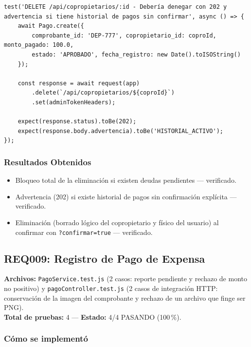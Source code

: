 \documentclass[12pt,a4paper]{article}
\begin{document}
\begin{lstlisting}[caption={Prueba de la advertencia 202 por historial activo (\texttt{copropietarioController.test.js})}]
test('DELETE /api/copropietarios/:id - Debería denegar con 202 y advertencia si tiene historial de pagos sin confirmar', async () => {
    await Pago.create({
        comprobante_id: 'DEP-777', copropietario_id: coproId, monto_pagado: 100.0,
        estado: 'APROBADO', fecha_registro: new Date().toISOString()
    });

    const response = await request(app)
        .delete(`/api/copropietarios/${coproId}`)
        .set(adminTokenHeaders);

    expect(response.status).toBe(202);
    expect(response.body.advertencia).toBe('HISTORIAL_ACTIVO');
});
\end{lstlisting}

\subsubsection*{Resultados Obtenidos}
\begin{itemize}[nosep]
    \item Bloqueo total de la eliminación si existen deudas pendientes — verificado.
    \item Advertencia (202) si existe historial de pagos sin confirmación explícita — verificado.
    \item Eliminación (borrado lógico del copropietario y físico del usuario) al confirmar
    con \texttt{?confirmar=true} — verificado.
\end{itemize}

\subsection{REQ009: Registro de Pago de Expensa}
\textbf{Archivos:} \texttt{PagoService.test.js} (2 casos: reporte pendiente y rechazo de
monto no positivo) y \texttt{pagoController.test.js} (2 casos de integración HTTP:
conservación de la imagen del comprobante y rechazo de un archivo que finge ser PNG).\\
\textbf{Total de pruebas:} 4 — \textbf{Estado:} 4/4 PASANDO (100\,\%).

\subsubsection*{Cómo se implementó}
\end{document}
